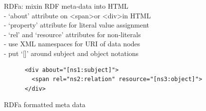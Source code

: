 RDFa: mixin RDF meta-data into HTML \\
- `about' attribute on \textless span\textgreater or \textless div\textgreater in HTML \\
- `property' attribute for literal value assignment \\
- `rel' and `resource' attributes for non-literals \\
- use XML namespaces for URI of data nodes \\
- put `[]' around subject and object notations \\

\begin{listing}[H]
	\begin{verbatim}
	  <div about="[ns1:subject]">
	    <span rel="ns2:relation" resource="[ns3:object]">
	  </div>
	\end{verbatim}
\caption{\gls{RDFa} formatted meta data}
\label{lst:rdfa_meta_data}
\end{listing}

